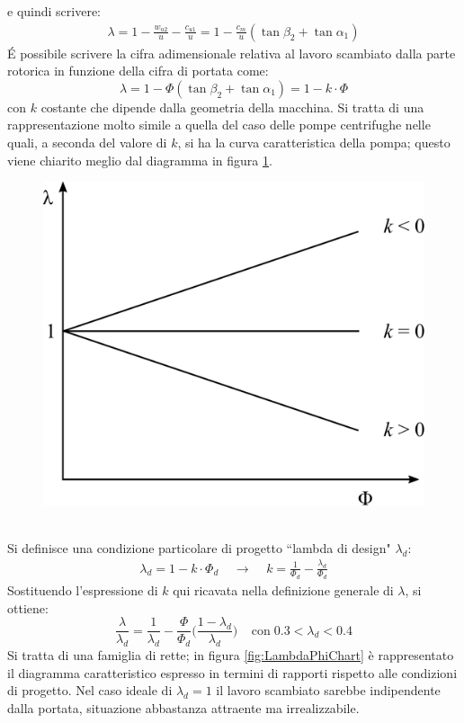 e quindi scrivere:
\begin{align*}
\lambda = 1- \frac{w_{u2}}{u} - \frac{c_{u1}}{u} = 1 - \frac{c_m}{u} \left(\tan \beta_2 + \tan \alpha_1 \right)
\end{align*}
\'E possibile scrivere la cifra adimensionale relativa al lavoro scambiato dalla parte rotorica in funzione della cifra di portata come:
\begin{equation}
\lambda = 1 - \Phi \left( \tan \beta_2 + \tan \alpha_1 \right) = 1 - k \cdot \Phi
\end{equation}
con $k$ costante che dipende dalla geometria della macchina. Si tratta di una rappresentazione molto simile a quella del caso delle pompe centrifughe nelle quali, a seconda del valore di $k$, si ha la curva caratteristica della pompa; questo viene chiarito meglio dal diagramma in figura \ref{fig:CondProg}.
\begin{figure}
\centering
  \includegraphics[width=.4\textwidth]{fig/CondProg.pdf}
\caption{}
\label{fig:CondProg}
\end{figure}
\\Si definisce una condizione particolare di progetto ``lambda di design" $\lambda_d$:
\begin{align*}
\lambda_d = 1 - k \cdot \Phi_d \;\;\;\; \rightarrow \;\;\;\; k = \frac{1}{\Phi_d}-\frac{\lambda_d}{\Phi_d}
\end{align*}
Sostituendo l'espressione di $k$ qui ricavata nella definizione generale di $\lambda$, si ottiene:
\begin{equation} \label{eq:lambdad}
\frac{\lambda}{\lambda_d} = \frac{1}{\lambda_d} - \frac{\Phi}{\Phi_d} \Bigg( \frac{1-\lambda_d}{\lambda_d} \Bigg) \;\;\;\; \text{con}\; 0.3 < \lambda_d < 0.4
\end{equation}
Si tratta di una famiglia di rette; in figura \ref{fig:LambdaPhiChart} è rappresentato il diagramma caratteristico espresso in termini di rapporti rispetto alle condizioni di progetto. Nel caso ideale di $\lambda_d = 1$ il lavoro scambiato sarebbe indipendente dalla portata, situazione abbastanza attraente ma irrealizzabile. 
